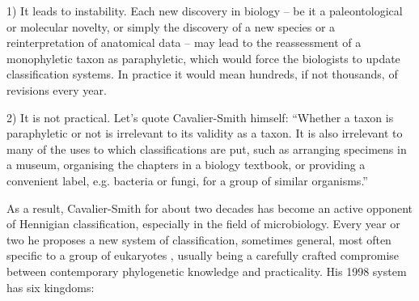 \begin{artengenv}
1) It leads to instability. Each new discovery in biology -- be it a paleontological or molecular novelty, or simply the
discovery of a new species or a reinterpretation of anatomical data -- may lead to the reassessment of a monophyletic
taxon as paraphyletic, which would force the biologists to update classification systems. In practice it would mean
hundreds, if not thousands, of revisions every year.

2) It is not practical. Let’s quote Cavalier-Smith himself: ``Whether a taxon is paraphyletic or not is irrelevant to its
validity as a taxon. It is also irrelevant to many of the uses to which classifications are put, such as arranging
specimens in a museum, organising the chapters in a biology textbook, or providing a convenient label, e.g. bacteria or
fungi, for a group of similar organisms.''
\parencite[p.212]{cavalier-smith_revised_1998}

As a result, Cavalier-Smith for about two decades has become an active opponent of Hennigian classification, especially
in the field of microbiology. Every year or two he proposes a new system of classification, sometimes general, most
often specific to a group of eukaryotes
\parencite{cavalier-smith_phagotrophic_2002,cavalier-smith_early_2013,cavalier-smith_higher_2016},
usually
being a carefully crafted compromise between contemporary phylogenetic knowledge and practicality. His 1998 system
\parencite{cavalier-smith_revised_1998}
has six kingdoms:


\end{artengenv}
